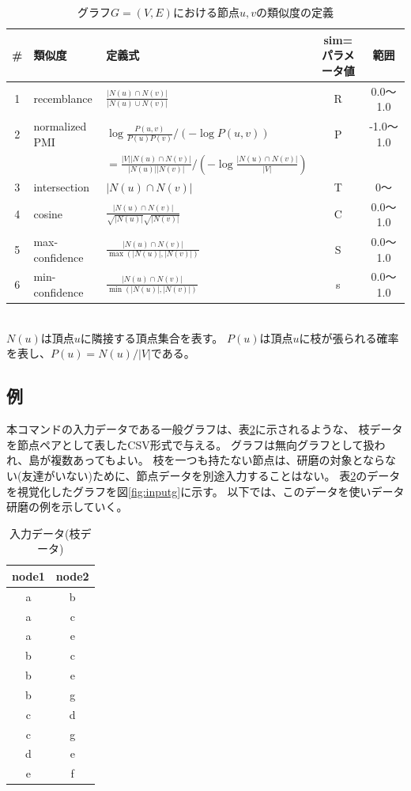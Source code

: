 \begin{table}[htbp]
\begin{center}
\caption{グラフ$G=(V,E)$における節点$u,v$の類似度の定義\label{tbl:simdef}}
\begin{tabular}{cllcc}
\hline
\# & 類似度&定義式&sim=パラメータ値&範囲 \\
\hline
1&recemblance    & $\frac{|N(u) \cap N(v)|}{|N(u) \cup N(v)|}$ & R & 0.0〜1.0\\
2&normalized PMI & $\log{\frac{P(u,v)}{P(u)P(v)}}/(-\log{P(u,v)})$ & P  & -1.0〜1.0\\
 &               & $=\frac{|V||N(u) \cap N(v)|}{|N(u)||N(v)|}/(-\log{\frac{|N(u) \cap N(v)|}{|V|}})$ & \\
3&intersection   & $|N(u) \cap N(v)|$ & T & 0〜\\
4&cosine         & $\frac{|N(u) \cap N(v)|}{\sqrt{|N(u)|}\sqrt{|N(v)|}}$ & C  & 0.0〜1.0\\
5&max-confidence & $\frac{|N(u) \cap N(v)|}{\max{(|N(u)|,|N(v)|)}}$ & S  & 0.0〜1.0\\
6&min-confidence & $\frac{|N(u) \cap N(v)|}{\min{(|N(u)|,|N(v)|)}}$ & s  & 0.0〜1.0\\
\hline
\end{tabular} 
\\
{\scriptsize
$N(u)$は頂点$u$に隣接する頂点集合を表す。
$P(u)$は頂点$u$に枝が張られる確率を表し、$P(u)=N(u)/|V|$である。
}
\end{center}
\end{table}

\subsection{例}
本コマンドの入力データである一般グラフは、表\ref{tbl:input}に示されるような、
枝データを節点ペアとして表したCSV形式で与える。
グラフは無向グラフとして扱われ、島が複数あってもよい。
枝を一つも持たない節点は、研磨の対象とならない(友達がいない)ために、節点データを別途入力することはない。
表\ref{tbl:input}のデータを視覚化したグラフを図\ref{fig:inputg}に示す。
以下では、このデータを使いデータ研磨の例を示していく。

\begin{table}[htbp]
\begin{center}
\caption{入力データ(枝データ)\label{tbl:input}}
\begin{tabular}{cc}
\hline
node1&node2 \\
\hline
a&b\\
a&c\\
a&e\\
b&c\\
b&e\\
b&g\\
c&d\\
c&g\\
d&e\\
e&f\\
\hline
\end{tabular} 
\end{center}
\end{table} 


